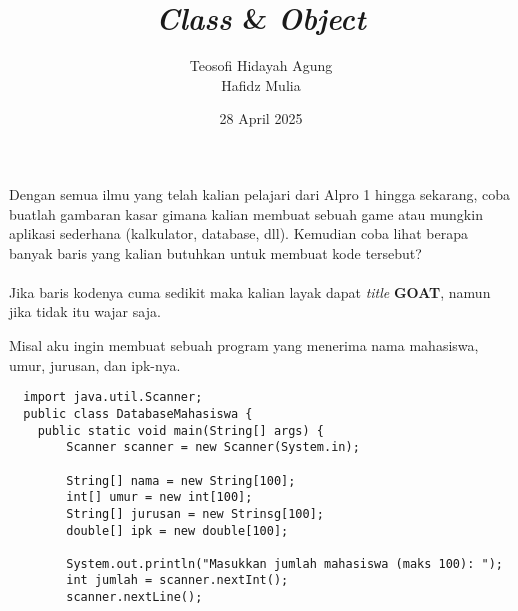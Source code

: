 \documentclass{../praktikum-ppt}
\author[Tew \& Haf]{Teosofi Hidayah Agung \\ Hafidz Mulia}
\date{28 April 2025}
\title[Alpro 2 - Week 5]{\textit{Class} \& \textit{Object}}
\institute[Matematika ITS]{Departemen Matematika\\ Institut Teknologi Sepuluh Nopember}
\begin{document}
{
\begin{frame}
  \titlepage
\end{frame}
}


  \begin{frame}
    \begin{masalah}
      Dengan semua ilmu yang telah kalian pelajari dari Alpro 1 hingga sekarang, coba buatlah gambaran kasar gimana kalian membuat sebuah game atau mungkin aplikasi sederhana (kalkulator, database, dll). Kemudian coba lihat berapa banyak baris yang kalian butuhkan untuk membuat kode tersebut?\\~\\

      Jika baris kodenya cuma sedikit maka kalian layak dapat \textit{title} \textbf{GOAT}, namun jika tidak itu wajar saja. 
    \end{masalah}
  \end{frame}

  \begin{frame}[fragile]
    \begin{contoh}
      Misal aku ingin membuat sebuah program yang menerima nama mahasiswa, umur, jurusan, dan ipk-nya.
    \end{contoh}
    \begin{lstlisting}
  import java.util.Scanner;
  public class DatabaseMahasiswa {
    public static void main(String[] args) {
        Scanner scanner = new Scanner(System.in);
        
        String[] nama = new String[100];
        int[] umur = new int[100];
        String[] jurusan = new Strinsg[100];
        double[] ipk = new double[100];

        System.out.println("Masukkan jumlah mahasiswa (maks 100): ");
        int jumlah = scanner.nextInt();
        scanner.nextLine();
    \end{lstlisting}
  \end{frame}
\end{document}
